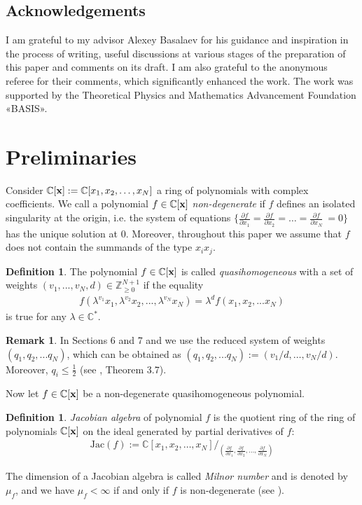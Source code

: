 \documentclass[reqno,12pt]{amsart}
\numberwithin{equation}{section}
\theoremstyle{plain}
\theoremstyle{definition}
\newtheorem{remark}[theorem]{Remark}
\newtheorem{definition}[theorem]{Definition}
\newcommand{\CC}{{\mathbb{C}}}
\newcommand{\ZZ}{{\mathbb{Z}}}
\newcommand{\bx}{{\bf x}}
\begin{document}
\subsection*{Acknowledgements}
I am grateful to my advisor Alexey Basalaev for his guidance and inspiration in the process of writing, useful
discussions at various stages of the preparation of this paper and comments on its draft. I am also grateful to the anonymous referee for their comments, which significantly enhanced the work. The work was supported by the Theoretical Physics and Mathematics Advancement Foundation «BASIS». 

\section{Preliminaries}
 Consider $\CC[\bx] := \mathbb{C}[x_1,x_2, \dots, x_N]$ a ring of polynomials with complex coefficients. We call a polynomial $f\in \CC[\bx]$ \emph{non-degenerate} if $f$ defines an isolated singularity at the origin, i.e. the system of equations $\{\frac{\partial f}{\partial x_1} = \frac{\partial f}{\partial x_2} = \dots = \frac{\partial f}{\partial x_N}\ = 0\}$ has the unique solution at $0$. Moreover, throughout this paper we assume that $f$ does not contain the summands of the type $x_ix_j$. 
 \begin{definition}
The polynomial $f\in \CC[\bx]$ is called \emph{quasihomogeneous} with a set of weights 
$(v_1,...,v_N,d)\in\ZZ_{\geq 0}^{N+1}$ if the equality 
\begin{align*}
f(\lambda^{v_1}x_1,\lambda^{v_2}x_2,...,\lambda^{v_N} x_N)=\lambda^d f(x_1,x_2,...x_N)
\end{align*}
is true for any $\lambda\in \CC^*$. 
\end{definition}
\begin{remark}
    In Sections 6 and 7 and we use the reduced system of weights $(q_1,q_2,...q_N)$, which can be obtained as $(q_1,q_2,...q_N) := (v_1/d, \dots, v_N/d)$. Moreover, $q_i \leq \frac{1}{2}$ (see \cite{HK}, Theorem 3.7).
\end{remark}
 Now let $f\in \CC[\bx]$ be a non-degenerate quasihomogeneous polynomial.

\begin{definition}
\emph{Jacobian algebra} of polynomial \textbf{$f$} is the quotient ring of the ring of polynomials $\CC[\bx]$ on the ideal generated by partial derivatives of $f$:
\begin{align*}
\mathrm{Jac}(f) := \mathbb{C}[x_1,x_2, \dots, x_N]/_{(\frac{\partial f}{\partial x_1}, \frac{\partial f}{\partial x_2}, \dots, \frac{\partial f}{\partial x_N})}
\end{align*}
\end{definition}
The dimension of a Jacobian algebra is called \emph{Milnor number} and is denoted by $\mu_f$, and we have $\mu_f < \infty$ if and only if $f$ is non-degenerate (see \cite{AGV}).
\end{document}
